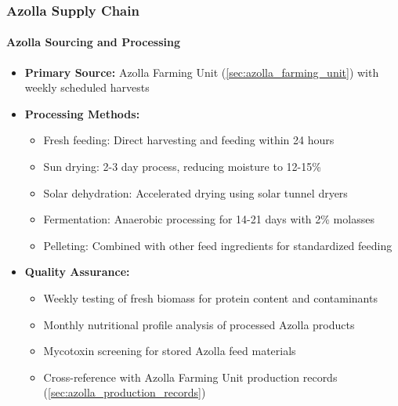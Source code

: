 \subsubsection{Azolla Supply Chain}
\label{sec:azolla_supply}

\paragraph{Azolla Sourcing and Processing}
\begin{itemize}
    \item \textbf{Primary Source:} Azolla Farming Unit (\ref{sec:azolla_farming_unit}) with weekly scheduled harvests
    \item \textbf{Processing Methods:}
    \begin{itemize}
        \item Fresh feeding: Direct harvesting and feeding within 24 hours
        \item Sun drying: 2-3 day process, reducing moisture to 12-15\%
        \item Solar dehydration: Accelerated drying using solar tunnel dryers
        \item Fermentation: Anaerobic processing for 14-21 days with 2\% molasses
        \item Pelleting: Combined with other feed ingredients for standardized feeding
    \end{itemize}
    \item \textbf{Quality Assurance:}
    \begin{itemize}
        \item Weekly testing of fresh biomass for protein content and contaminants
        \item Monthly nutritional profile analysis of processed Azolla products
        \item Mycotoxin screening for stored Azolla feed materials
        \item Cross-reference with Azolla Farming Unit production records (\ref{sec:azolla_production_records})
    \end{itemize}
\end{itemize}


